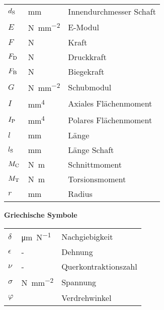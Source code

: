 \begin{tabular}{p{2cm} p{2cm} l}
$d_{\rm{S}}$ 			& \si{\milli\meter}							&Innendurchmesser Schaft \\

$E$						& \si{\newton\per\milli\meter^2}		&E-Modul \\

$F$						& \si{\newton}								&Kraft \\

$F_{\rm{D}}$			& \si{\newton}								&Druckkraft \\

$F_{\rm{B}}$			& \si{\newton}								&Biegekraft \\

$G$						& \si{\newton\per\milli\meter^2}		&Schubmodul \\

$I$						& \si{\milli\meter^4}							&Axiales Flächenmoment \\

$I_{\rm{P}}	$			& \si{\milli\meter^4}							&Polares Flächenmoment \\

$l$						& \si{\milli\meter}								&Länge \\

$l_{\rm{S}}$			& \si{\milli\meter}							&Länge Schaft \\

$M_{\rm{C}}$			& \si{\newton\meter}						&Schnittmoment \\

$M_{\rm{T}}$			& \si{\newton\meter}						&Torsionsmoment \\

$r$						& \si{\milli\meter}							&Radius \\

\end{tabular} \vspace{0.5cm}

\textbf{Griechische Symbole} \vspace{0.5cm}

\begin{tabular}{p{2cm} p{2cm} l}
$\delta$				& \si{\micro\meter\per\newton}			&Nachgiebigkeit \\

$\epsilon$				& -												&Dehnung \\

$\nu$					& - 												&Querkontraktionszahl \\

$\sigma$				& \si{\newton\per\milli\meter^2}		&Spannung \\

$\varphi$				& \si{\circ}										&Verdrehwinkel \\


\end{tabular}